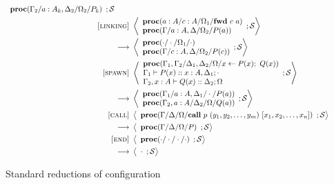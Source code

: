 \documentclass[12pt, openany]{memoir}
\newcommand*{\call}[3]{\textbf{call}\ #1\ (#2)\ [#3]}
\newcommand*{\fwd}[2]{\textbf{fwd}\ #1\ #2}
\newcommand*{\spawn}[3]{#3 \leftarrow #1(#3);\ #2(#3)}
\newcommand*{\judge}[4]{#1 \vdash #2 :: #3; #4}
\newcommand*{\procObj}[4]{\textbf{proc}(#1/#2/#3/#4)}
\newcommand*{\cancelSet}[0]{\mathcal{S}}
\begin{document}
\begin{figure}[H]
\begin{alignat}{2}
{\begin{array}{l}
          \procObj{\Gamma_2}{a : A_k, \Delta_2}{\Omega_2}{P_k}
        \end{array}
        ; \cancelSet
    } \tag*{} \\
    \label{forward} \textsc{[linking]} & ~ 
      \Braket{
        \begin{array}{l}
          \procObj{a : A}{c : A}{\Omega_1}{\fwd{c}{a}} \\
          \procObj{\Gamma}{a : A, \Delta}{\Omega_2}{P(a)}
        \end{array}
        ; \cancelSet
      } \tag*{} \\ ~ \longrightarrow & ~ 
      \Braket{
        \begin{array}{l}
          \procObj{\cdot}{\cdot}{\Omega_1}{\cdot} \\
          \procObj{\Gamma}{c : A, \Delta}{\Omega_2}{P(c)}
        \end{array}
        ; \cancelSet
    } \tag*{} \\
    \label{spawn} \textsc{[spawn]} & ~ 
      \Braket{
        \begin{array}{l}
          \procObj{\Gamma_1, \Gamma_2}{\Delta_1, \Delta_2}{\Omega}{\spawn{P}{Q}{x}}\\
          \judge{\Gamma_1}{P(x)}{x : A, \Delta_1}{\cdot}\\
          \judge{\Gamma_2, x : A}{Q(x)}{\Delta_2}{\Omega}
        \end{array}
        ; \cancelSet
      } \tag*{} \\ ~ \longrightarrow & ~ 
      \Braket{
        \begin{array}{l}
          \procObj{\Gamma_1}{a : A, \Delta_1}{\cdot}{P(a)} \\
          \procObj{\Gamma_2, a : A}{\Delta_2}{\Omega}{Q(a)}
        \end{array}
        ; \cancelSet
    } \tag*{} \\
    \label{call} \textsc{[call]} & ~ 
      \Braket{
        \begin{array}{l}
          \procObj{\Gamma}{\Delta}{\Omega}{\call{p}{y_1, y_2, \ldots, y_m}{x_1, x_2, \ldots, x_n}}
        \end{array}
        ; \cancelSet
      } \tag*{} \\ ~ \longrightarrow & ~ 
      \Braket{
        \begin{array}{l}
          \procObj{\Gamma}{\Delta}{\Omega}{P}
        \end{array}
        ; \cancelSet
    } \tag*{} \\
    \label{finish} \textsc{[end]} & ~ 
      \Braket{
        \begin{array}{l}
          \procObj{\cdot}{\cdot}{\cdot}{\cdot}
        \end{array}
        ; \cancelSet
      } \tag*{} \\ ~ \longrightarrow & ~ 
      \Braket{
        \begin{array}{l}
          \cdot
        \end{array}
        ; \cancelSet
    } \tag*{}
  \end{alignat}
  \raggedleft
  \caption{Standard reductions of configuration}
  \label{fig:stdreduction}
\end{figure}
\end{document}
